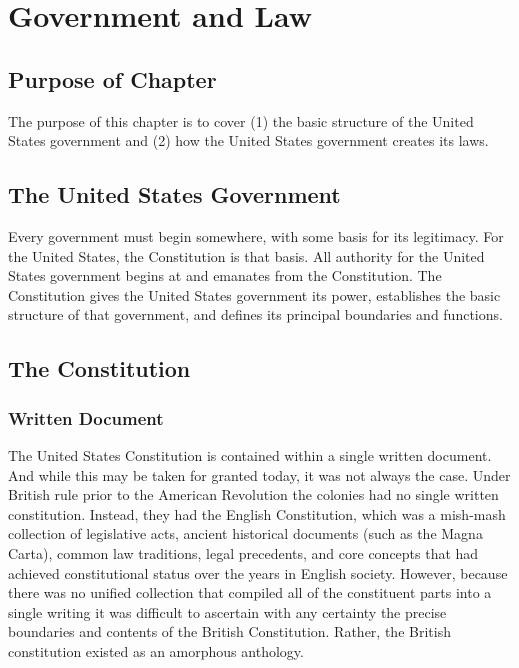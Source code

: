 %
%
%
%
%
%

\chapter{Government and Law}

\section{Purpose of Chapter}

The purpose of this chapter is to cover (1) the basic structure of the United States government and (2) how the United States government creates its laws.

\section{The United States Government}

Every government must begin somewhere, with some basis for its legitimacy.  For the United States, the Constitution is that basis.  All authority for the United States government begins at and emanates from the Constitution.  The Constitution gives the United States government its power, establishes the basic structure of that government, and defines its principal boundaries and functions.


\section{The Constitution}

\subsection{Written Document}
The United States Constitution is contained within a single written document.  And while this may be taken for granted today, it was not always the case.  Under British rule prior to the American Revolution the colonies had no single written constitution.  Instead, they had the English Constitution, which was a mish-mash collection of legislative acts, ancient historical documents (such as the Magna Carta), common law traditions, legal precedents, and core concepts that had achieved constitutional status over the years in English society.  However, because there was no unified collection that compiled all of the constituent parts into a single writing it was difficult to ascertain with any certainty the precise boundaries and contents of the British Constitution.  Rather, the British constitution existed as an amorphous anthology.

